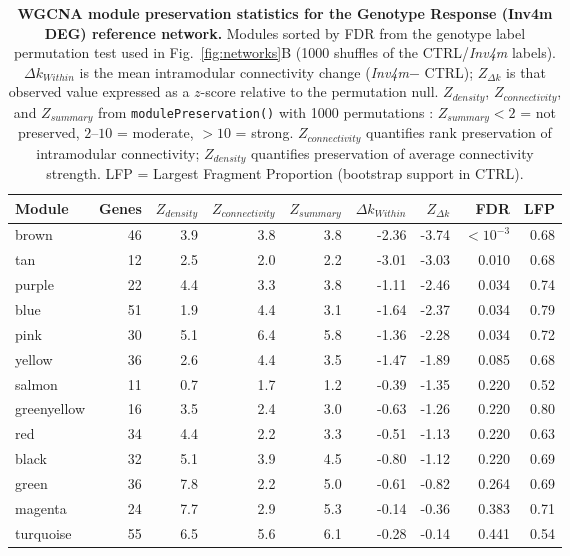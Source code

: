 \documentclass[9pt,twocolumn,twoside]{rilabRxiv}
\newcommand{\invfour}{\textit{Inv4m}\xspace}
\begin{document}
\begin{table}[!ht]
\caption{\textbf{WGCNA module preservation statistics for the Genotype Response (Inv4m DEG) reference network.} Modules sorted by FDR from the genotype label permutation test used in Fig.~\ref{fig:networks}B (1000 shuffles of the CTRL/\invfour labels). $\Delta k_{Within}$ is the mean intramodular connectivity change (\invfour $-$ CTRL); $Z_{\Delta k}$ is that observed value expressed as a $z$-score relative to the permutation null. $Z_{density}$, $Z_{connectivity}$, and $Z_{summary}$ from \texttt{modulePreservation()} with 1000 permutations \cite{langfelder2011}: $Z_{summary} < 2$ = not preserved, $2$--$10$ = moderate, $> 10$ = strong. $Z_{connectivity}$ quantifies rank preservation of intramodular connectivity; $Z_{density}$ quantifies preservation of average connectivity strength. LFP = Largest Fragment Proportion (bootstrap support in CTRL).}
\label{tab::preservation}
\centering
\small
\begin{tabular}{@{}lrrrrrrrr@{}}
\toprule
\textbf{Module} & \textbf{Genes} & \textbf{$Z_{density}$} & \textbf{$Z_{connectivity}$} & \textbf{$Z_{summary}$} & \textbf{$\Delta k_{Within}$} & \textbf{$Z_{\Delta k}$} & \textbf{FDR} & \textbf{LFP} \\
\midrule
brown & 46 & 3.9 & 3.8 & 3.8 & -2.36 & -3.74 & $< 10^{-3}$ & 0.68 \\
tan & 12 & 2.5 & 2.0 & 2.2 & -3.01 & -3.03 & 0.010 & 0.68 \\
purple & 22 & 4.4 & 3.3 & 3.8 & -1.11 & -2.46 & 0.034 & 0.74 \\
blue & 51 & 1.9 & 4.4 & 3.1 & -1.64 & -2.37 & 0.034 & 0.79 \\
pink & 30 & 5.1 & 6.4 & 5.8 & -1.36 & -2.28 & 0.034 & 0.72 \\
yellow & 36 & 2.6 & 4.4 & 3.5 & -1.47 & -1.89 & 0.085 & 0.68 \\
salmon & 11 & 0.7 & 1.7 & 1.2 & -0.39 & -1.35 & 0.220 & 0.52 \\
greenyellow & 16 & 3.5 & 2.4 & 3.0 & -0.63 & -1.26 & 0.220 & 0.80 \\
red & 34 & 4.4 & 2.2 & 3.3 & -0.51 & -1.13 & 0.220 & 0.63 \\
black & 32 & 5.1 & 3.9 & 4.5 & -0.80 & -1.12 & 0.220 & 0.69 \\
green & 36 & 7.8 & 2.2 & 5.0 & -0.61 & -0.82 & 0.264 & 0.69 \\
magenta & 24 & 7.7 & 2.9 & 5.3 & -0.14 & -0.36 & 0.383 & 0.71 \\
turquoise & 55 & 6.5 & 5.6 & 6.1 & -0.28 & -0.14 & 0.441 & 0.54 \\
\bottomrule
\end{tabular}
\end{table}
\end{document}
